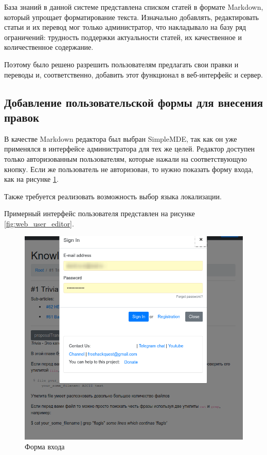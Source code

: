 \vspace{1em}

База знаний в данной системе представлена списком статей в формате Markdown, 
который упрощает форматирование текста.
Изначально добавлять, редактировать статьи и их перевод 
мог только администратор, что накладывало на базу ряд ограничений: 
трудность поддержки актуальности статей, их качественное и количественное содержание.

Поэтому было решено разрешить пользователям предлагать свои правки и переводы
и, соответственно, добавить этот функционал в веб-интерфейс и сервер.

\vspace{1em}

\subsection{Добавление пользовательской формы для внесения правок}

\vspace{1em}

В качестве Markdown редактора был выбран SimpleMDE, так как он уже применялся в 
интерфейсе администратора для тех же целей.
Редактор доступен только авторизованным пользователям, которые нажали на соответствующую кнопку.
Если же пользователь не авторизован, то нужно показать форму входа, как на рисунке \ref{fig:user_sign_in}.

Также требуется реализовать возможность выбор языка локализации.

Примерный интерфейс пользователя представлен на рисунке \ref{fig:web_user_editor}.

\begin{figure}[!h]
    \centering
    \includegraphics[width=0.6\linewidth]{images/user_sign_in.png}
    \caption{Форма входа}
    \label{fig:user_sign_in}
\end{figure}

